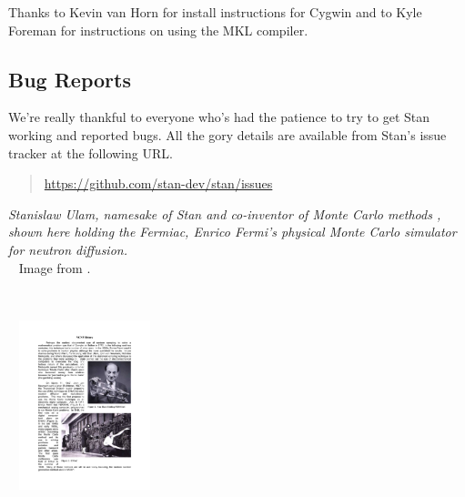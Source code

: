 Thanks to Kevin van Horn for install instructions for Cygwin and to
Kyle Foreman for instructions on using the MKL compiler.


\subsection*{Bug Reports}

We're really thankful to everyone who's had the patience to try
to get Stan working and reported bugs.  All the gory details are
available from Stan's issue tracker at the following URL.
%
\begin{quote}
\url{https://github.com/stan-dev/stan/issues}
\end{quote}




\vfill
\begin{center}
\hfill
\begin{minipage}[b]{2in}
  \footnotesize {\it Stanislaw Ulam, namesake of Stan and co-inventor
    of Monte Carlo methods \citep{MetropolisUlam:1949}, shown here
    holding the Fermiac, Enrico Fermi's physical Monte Carlo simulator
    for neutron diffusion.}
  \\[3pt] \mbox{ } \hfill
  {\scriptsize Image from \citep{Giesler:2000}.}
\end{minipage} \ \ \ \ \
\begin{minipage}[b]{1.5in} \mbox{ } \hfill
  \includegraphics[width=1.5in]{img/ulam-fermiac.pdf}
\end{minipage}
\end{center}
